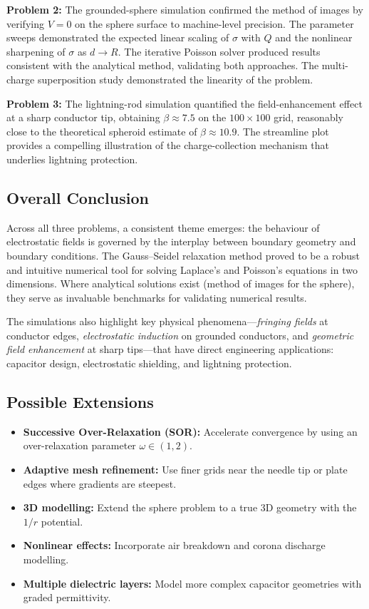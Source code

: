 \documentclass[11pt,a4paper]{article}
\begin{document}
\textbf{Problem 2:} The grounded-sphere simulation confirmed the method of images by verifying $V=0$ on the sphere surface to machine-level precision. The parameter sweeps demonstrated the expected linear scaling of $\sigma$ with $Q$ and the nonlinear sharpening of $\sigma$ as $d \to R$. The iterative Poisson solver produced results consistent with the analytical method, validating both approaches. The multi-charge superposition study demonstrated the linearity of the problem.

\textbf{Problem 3:} The lightning-rod simulation quantified the field-enhancement effect at a sharp conductor tip, obtaining $\beta \approx 7.5$ on the $100 \times 100$ grid, reasonably close to the theoretical spheroid estimate of $\beta \approx 10.9$. The streamline plot provides a compelling illustration of the charge-collection mechanism that underlies lightning protection.

\subsection{Overall Conclusion}

Across all three problems, a consistent theme emerges: the behaviour of electrostatic fields is governed by the interplay between boundary geometry and boundary conditions. The Gauss--Seidel relaxation method proved to be a robust and intuitive numerical tool for solving Laplace's and Poisson's equations in two dimensions. Where analytical solutions exist (method of images for the sphere), they serve as invaluable benchmarks for validating numerical results.

The simulations also highlight key physical phenomena---\emph{fringing fields} at conductor edges, \emph{electrostatic induction} on grounded conductors, and \emph{geometric field enhancement} at sharp tips---that have direct engineering applications: capacitor design, electrostatic shielding, and lightning protection.

\subsection{Possible Extensions}
\begin{itemize}[leftmargin=2em]
\item \textbf{Successive Over-Relaxation (SOR):} Accelerate convergence by using an over-relaxation parameter $\omega \in (1,2)$.
\item \textbf{Adaptive mesh refinement:} Use finer grids near the needle tip or plate edges where gradients are steepest.
\item \textbf{3D modelling:} Extend the sphere problem to a true 3D geometry with the $1/r$ potential.
\item \textbf{Nonlinear effects:} Incorporate air breakdown and corona discharge modelling.
\item \textbf{Multiple dielectric layers:} Model more complex capacitor geometries with graded permittivity.
\end{itemize}
\end{document}
